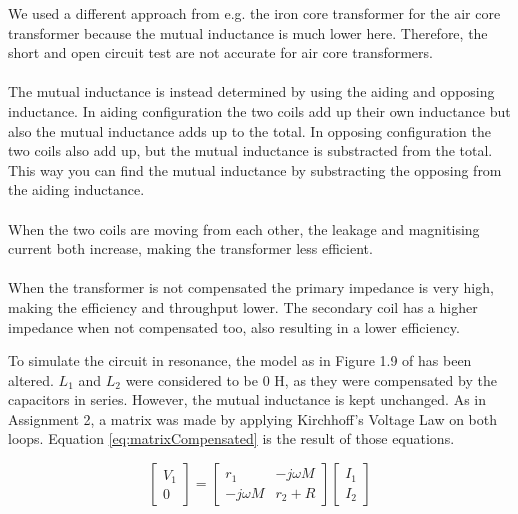 \documentclass[final]{scrreprt} %
\begin{document}
We used a different approach from e.g. the iron core transformer for the air core transformer because the mutual inductance is much lower here. Therefore, the short and open circuit test are not accurate for air core transformers.
\\ \\
The mutual inductance is instead determined by using the aiding and opposing inductance. In aiding configuration the two coils add up their own inductance but also the mutual inductance adds up to the total. In opposing configuration the two coils also add up, but the mutual inductance is substracted from the total. This way you can find the mutual inductance by substracting the opposing from the aiding inductance.
\\ \\
When the two coils are moving from each other, the leakage and magnitising current both increase, making the transformer less efficient.
\\ \\
When the transformer is not compensated the primary impedance is very high, making the efficiency and throughput lower. The secondary coil has a higher impedance when not compensated too, also resulting in a lower efficiency.

To simulate the circuit in resonance, the model as in Figure 1.9 of \cite{epo4-manual} has been altered. $L_1$ and $L_2$ were considered to be 0 H, as they were compensated by the capacitors in series. However, the mutual inductance is kept unchanged. As in Assignment 2, a matrix was made by applying Kirchhoff's Voltage Law on both loops. Equation \ref{eq:matrixCompensated} is the result of those equations.

\begin{equation}
	\begin{bmatrix}
		V_1 \\
		0
	\end{bmatrix} =
	\begin{bmatrix}
		 r_1 & -j \omega M \\
		-j \omega M & r_2 + R
	\end{bmatrix}
	\begin{bmatrix}
		I_1 \\
		I_2
	\end{bmatrix}
	\label{eq:matrixCompensated}
\end{equation}
\end{document}
